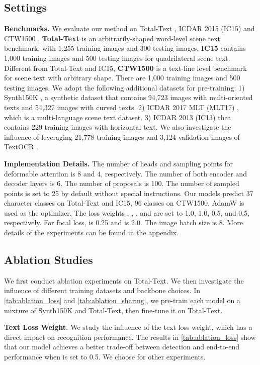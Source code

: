 \documentclass[10pt,twocolumn,letterpaper]{article}
\begin{document}
\subsection{Settings}
\noindent \textbf{Benchmarks.} We evaluate our method on Total-Text \cite{ch2020total}, ICDAR 2015 (IC15) \cite{karatzas2015icdar} and CTW1500 \cite{liu2019curved}. \textbf{Total-Text} is an arbitrarily-shaped word-level scene text benchmark, with 1,255 training images and 300 testing images. \textbf{IC15} contains 1,000 training images and 500 testing images for quadrilateral scene text. Different from Total-Text and IC15, \textbf{CTW1500} is a text-line level benchmark for scene text with arbitrary shape. There are 1,000 training images and 500 testing images. We adopt the following additional datasets for pre-training: 1) Synth150K \cite{liu2020abcnet}, a synthetic dataset that contains 94,723 images with multi-oriented texts and 54,327 images with curved texts. 2) ICDAR 2017 MLT (MLT17) \cite{nayef2017icdar2017}, which is a multi-language scene text dataset. 3) ICDAR 2013 (IC13) \cite{karatzas2013icdar} that contains 229 training images with horizontal text. We also investigate the influence of leveraging 21,778 training images and 3,124 validation images of TextOCR \cite{singh2021textocr}.

\noindent \textbf{Implementation Details.} 
The number of heads and sampling points for deformable attention is 8 and 4, respectively. The number of both encoder and decoder layers is 6. The number of proposals  is 100. The number of sampled points  is set to 25 by default without special instructions. Our models predict 37 character classes on Total-Text and IC15, 96 classes on CTW1500. AdamW \cite{loshchilov2017decoupled} is used as the optimizer. The loss weights , ,
, and  are set to 1.0, 1.0, 0.5, and 0.5, respectively. For focal loss,  is 0.25 and  is 2.0.
The image batch size is 8. More details of the experiments can be found in the appendix. 

\subsection{Ablation Studies}
\label{sec:ablation}
We first conduct ablation experiments on Total-Text. We then investigate the influence of different training datasets and backbone choices. In \cref{tab:ablation_loss} and \cref{tab:ablation_sharing}, we pre-train each model on a mixture of Synth150K and Total-Text, then fine-tune it on Total-Text.

\noindent \textbf{Text Loss Weight.} We study the influence of the text loss weight, which has a direct impact on recognition performance. The results in \cref{tab:ablation_loss} show that our model achieves a better trade-off between detection and end-to-end performance when  is set to 0.5. We choose  for other experiments.
\end{document}
